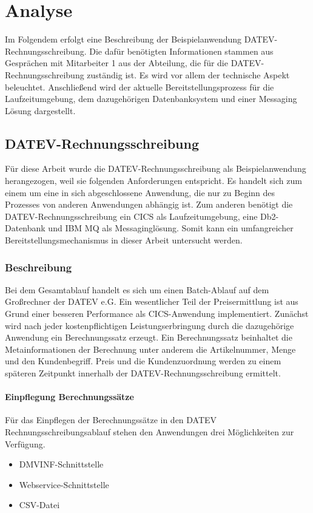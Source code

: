 \chapter{Analyse}\label{ch:analyse}
Im Folgendem erfolgt eine Beschreibung der Beispielanwendung \glqq DATEV-Rechnungsschreibung\grqq.
Die dafür benötigten Informationen stammen aus Gesprächen mit Mitarbeiter 1 aus der Abteilung, die für die DATEV-Rechnungsschreibung zuständig ist.
Es wird vor allem der technische Aspekt beleuchtet.
Anschließend wird der aktuelle Bereitstellungsprozess für die Laufzeitumgebung, dem dazugehörigen Datenbanksystem und einer Messaging Lösung dargestellt.

\section{DATEV-Rechnungsschreibung}
Für diese Arbeit wurde die DATEV-Rechnungsschreibung als Beispielanwendung herangezogen, weil sie folgenden Anforderungen entspricht.
Es handelt sich zum einem um eine in sich abgeschlossene Anwendung, die nur zu Beginn des Prozesses von anderen Anwendungen abhängig ist.
Zum anderen benötigt die DATEV-Rechnungsschreibung ein CICS als Laufzeitumgebung, eine Db2-Datenbank und IBM MQ als Messaginglösung.
Somit kann ein umfangreicher Bereitstellungsmechanismus in dieser Arbeit untersucht werden.

\subsection{Beschreibung}\label{rechBesch}
Bei dem Gesamtablauf handelt es sich um einen Batch-Ablauf auf dem Großrechner der DATEV e.G.
Ein wesentlicher Teil der Preisermittlung ist aus Grund einer besseren Performance als CICS-Anwendung implementiert.
Zunächst wird nach jeder kostenpflichtigen Leistungserbringung durch die dazugehörige Anwendung ein Berechnungssatz erzeugt.
Ein Berechnungssatz beinhaltet die Metainformationen der Berechnung unter anderem die Artikelnummer, Menge und den Kundenbegriff.
Preis und die Kundenzuordnung werden zu einem späteren Zeitpunkt innerhalb der DATEV-Rechnungsschreibung ermittelt.

\subsubsection{Einpflegung Berechnungssätze}
Für das Einpflegen der Berechnungssätze in den DATEV Rechnungsschreibungsablauf stehen den Anwendungen drei Möglichkeiten zur Verfügung.
\begin{itemize}
\item DMVINF-Schnittstelle
\item Webservice-Schnittstelle
\item CSV-Datei
\end{itemize}

